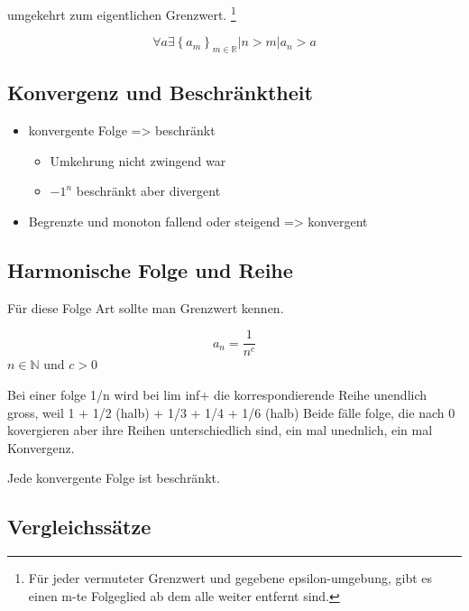 \begin{definition}
     umgekehrt zum eigentlichen Grenzwert.  \footnote{Für jeder vermuteter Grenzwert und gegebene epsilon-umgebung, gibt es einen m-te Folgeglied ab dem alle weiter entfernt sind.}

    \begin{equation}
         \forall a \exists \left\{a_m\right\}_{m\in\mathbb{R}} | n > m | a_n > a
    \end{equation}
\end{definition}

\subsection{Konvergenz und Beschränktheit}
\begin{itemize}
    \item konvergente Folge => beschränkt
    \begin{itemize}
        \item Umkehrung nicht zwingend war
        \item $-1^n$ beschränkt aber divergent  
    \end{itemize}
    \item Begrenzte und monoton fallend oder steigend => konvergent   
\end{itemize}
\subsection{Harmonische Folge und Reihe}
Für diese Folge Art sollte man Grenzwert kennen.

\begin{definition}
    \begin{equation}
        a_n = \frac{1}{n^c}
    \end{equation}
    $n \in \mathbb{N}$ und $c>0$
\end{definition}

Bei einer folge 1/n wird
bei lim inf+ die korrespondierende Reihe unendlich gross, weil 1 + 1/2 (halb) + 1/3 + 1/4 + 1/6 (halb)
Beide fälle folge, die nach 0 kovergieren aber ihre Reihen unterschiedlich sind, ein mal unednlich, ein mal Konvergenz.

\begin{theorem}
    Jede konvergente Folge ist beschränkt.
\end{theorem}

\subsection{Vergleichssätze}

